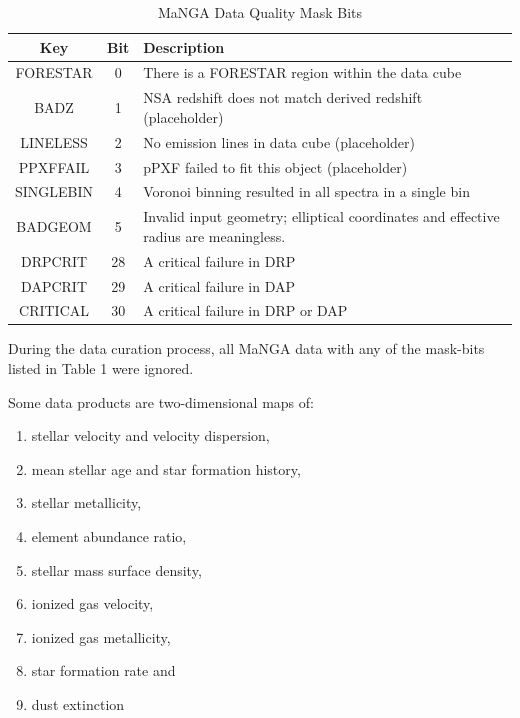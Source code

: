 \begin{table}[h!]
\centering
\begin{tabular}{|c|c|l|} 
 \hline
 Key & Bit & Description \\ [0.5ex] 
 \hline
 FORESTAR & 0 & There is a FORESTAR region within the data cube \\ 
 \hline
 BADZ & 1 & NSA redshift does not match derived redshift (placeholder) \\
 \hline
 LINELESS & 2 & No emission lines in data cube (placeholder) \\
 \hline
 PPXFFAIL & 3 & pPXF failed to fit this object (placeholder) \\
 \hline
 SINGLEBIN & 4 & Voronoi binning resulted in all spectra in a single bin \\
 \hline
 BADGEOM & 5 & Invalid input geometry; elliptical coordinates and effective radius are meaningless. \\
 \hline
 DRPCRIT & 28 & A critical failure in DRP \\
 \hline
 DAPCRIT & 29 & A critical failure in DAP \\ 
 \hline
 CRITICAL & 30 & A critical failure in DRP or DAP \\ [1ex] 
 \hline
\end{tabular}
\caption{MaNGA Data Quality Mask Bits}
\label{table:MaNGA Data Quality Mask Bits}
\end{table}

During the data curation process, all MaNGA data with any of the mask-bits listed in Table 1 were ignored.

Some data products are two-dimensional maps of:

\begin{enumerate}
  \item  stellar velocity and velocity dispersion, 
  
  \item mean stellar age and star formation history, 
  
  \item stellar metallicity, 
  
  \item element abundance ratio, 
  
  \item stellar mass surface density, 
  
  \item ionized gas velocity, 
  
  \item ionized gas metallicity, 
  
  \item star formation rate and 
  
  \item dust extinction
\end{enumerate}
